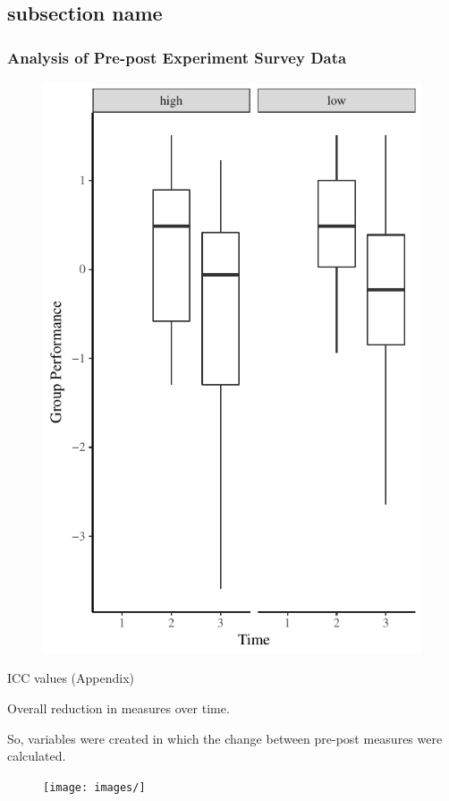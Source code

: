 

\subsection{subsection name}

\subsubsection{Analysis of Pre-post Experiment Survey Data}


\begin{figure}
  \centering
  \includegraphics[width=0.5\linewidth,keepaspectratio] {images/groupPerfConfPlot}
  \label{fig:groupPerfConfPlot}
  \caption{}
\end{figure}

ICC values (Appendix)




Overall reduction in measures over time.

So, variables were created in which the change between pre-post measures were calculated.





\begin{figure}
    \centering
    \texttt{[image: images/]}
    \caption{}
    \label{fig:}
\end{figure}


